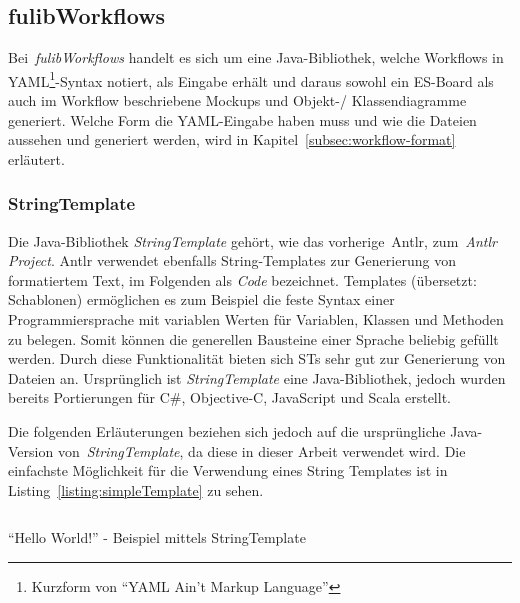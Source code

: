 \subsection{fulibWorkflows}\label{subsec:fulibworkflows}
Bei~\textit{fulibWorkflows} handelt es sich um eine Java-Bibliothek, welche Workflows in YAML\footnote{Kurzform von ``YAML Ain't Markup Language''}-Syntax notiert,
als Eingabe erhält und daraus
sowohl ein \ac{ES}-Board als auch im Workflow beschriebene Mockups und Objekt-/ Klassendiagramme generiert.
Welche Form die YAML-Eingabe haben muss und wie die Dateien aussehen und generiert werden, wird in Kapitel~\ref{subsec:workflow-format} erläutert.



\subsubsection{StringTemplate}
Die Java-Bibliothek \textit{StringTemplate} gehört, wie das vorherige~\ac{Antlr}, zum~\textit{Antlr Project}.
\ac{Antlr} verwendet ebenfalls String-Templates zur Generierung von formatiertem Text, im Folgenden als \textit{Code} bezeichnet.
Templates (übersetzt: Schablonen) ermöglichen es zum Beispiel die feste Syntax einer Programmiersprache mit variablen Werten für
Variablen, Klassen und Methoden zu belegen.
Somit können die generellen Bausteine einer Sprache beliebig gefüllt werden.
Durch diese Funktionalität bieten sich \acp{ST} sehr gut zur Generierung von Dateien an.
Ursprünglich ist \textit{StringTemplate} eine Java-Bibliothek, jedoch wurden bereits Portierungen für C\#, Objective-C, JavaScript und Scala erstellt.

Die folgenden Erläuterungen beziehen sich jedoch auf die ursprüngliche Java-Version von~\textit{StringTemplate}, da diese in dieser Arbeit verwendet wird.
Die einfachste Möglichkeit für die Verwendung eines String Templates ist in Listing~\ref{listing:simpleTemplate} zu sehen.

\begin{listing}[!ht]
    \inputminted{java}{listings/2.2.1/JavaStringTemplateExample.java}
    \caption{``Hello World!'' - Beispiel mittels StringTemplate}
    \label{listing:simpleTemplate}
\end{listing}

